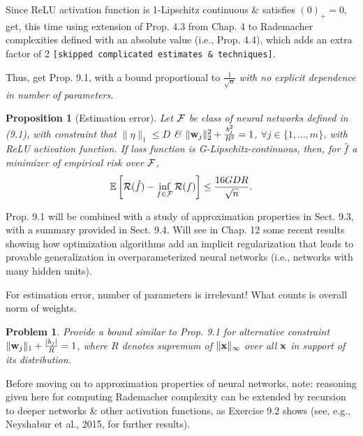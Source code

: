 \documentclass{article}
\newtheorem{problem}{Problem}
\newtheorem{proposition}{Proposition}
\begin{document}
\begin{enumerate}
\begin{itemize}
\begin{itemize}
\begin{itemize}
				Since ReLU activation function is 1-Lipschitz continuous \& satisfies $(0)_+ = 0$, get, this time using extension of Prop. 4.3 from Chap. 4 to Rademacher complexities defined with an absolute value (i.e., Prop. 4.4), which adds an extra factor of 2 {\tt[skipped complicated estimates \& techniques]}.
				
				Thus, get Prop. 9.1, with a bound proportional to $\frac{1}{\sqrt{n}}$ {\it with no explicit dependence in number of parameters}.
				
				\begin{proposition}[Estimation error]
					Let ${\cal F}$ be class of neural networks defined in (9.1), with constraint that $\|\eta\|_1\le D$ \& $\|{\bf w}_j\|_2^2 + \frac{b_j^2}{R^2} = 1$, $\forall j\in\{1,\ldots,m\}$, with ReLU activation function. If loss function is G-Lipschitz-continuous, then, for $\hat{f}$ a minimizer of empirical risk over ${\cal F}$,
					\begin{equation}
						\mathbb{E}\left[{\cal R}(\hat{f}) - \inf_{f\in{\cal F}} {\cal R}(f)\right]\le\frac{16GDR}{\sqrt{n}}.
					\end{equation}
				\end{proposition}
				Prop. 9.1 will be combined with a study of approximation properties in Sect. 9.3, with a summary provided in Sect. 9.4. Will see in Chap. 12 some recent results showing how optimization algorithms add an implicit regularization that leads to provable generalization in overparameterized neural networks (i.e., networks with many hidden units).
				
				For estimation error, number of parameters is irrelevant! What counts is overall norm of weights.
				
				\begin{problem}
					Provide a bound similar to Prop. 9.1 for alternative constraint $\|{\bf w}_j\|_1 + \frac{|b_j|}{R} = 1$, where $R$ denotes supremum of $\|{\bf x}\|_\infty$ over all ${\bf x}$ in support of its distribution.
				\end{problem}
				Before moving on to approximation properties of neural networks, note: reasoning given here for computing Rademacher complexity can be extended by recursion to deeper networks \& other activation functions, as Exercise 9.2 shows (see, e.g., Neyshabur et al., 2015, for further results).
				

\end{itemize}
\end{itemize}
\end{itemize}
\end{enumerate}
\end{document}
